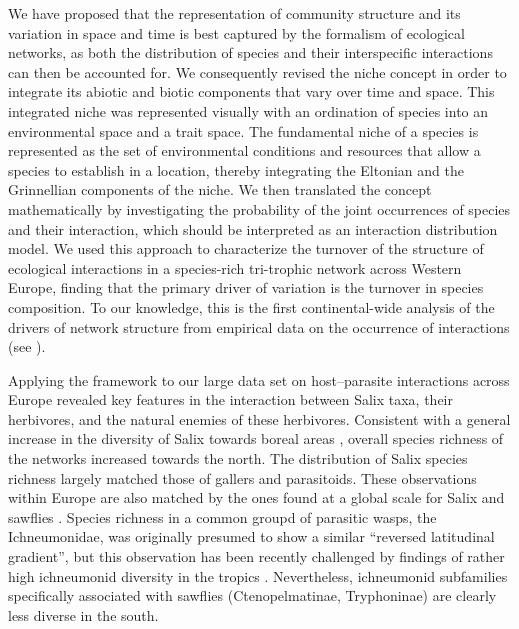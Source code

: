 \documentclass[12pt]{article}
\begin{document}
We have proposed that the representation of community structure and its
variation in space and time is best captured by the formalism of
ecological networks, as both the distribution of species and their
interspecific interactions can then be accounted for. We consequently revised
the niche concept in order to integrate its abiotic and biotic
components that vary over time and space. This
integrated niche was represented visually with an ordination of species into
an environmental space and a trait space. The fundamental niche of a species
is represented as the set of environmental conditions and resources that allow
a species to establish in a location, thereby integrating the Eltonian and the
Grinnellian components of the niche. We then translated the concept
mathematically by investigating the probability of the joint occurrences of
species and their interaction, which should be interpreted as an interaction
distribution model. We used this approach to characterize the turnover of the
structure of ecological interactions in a species-rich tri-trophic network
across Western Europe, finding that the primary driver of variation is the
turnover in species composition. To our knowledge, this is the first
continental-wide analysis of the drivers of network structure from empirical
data on the occurrence of interactions (see \citealt{Baiser2012,Albouy2014,
Poisot2016}).

Applying the framework to our large data set on host–parasite interactions
across Europe revealed key features in the interaction between Salix taxa,
their herbivores, and the natural enemies of these herbivores. Consistent with
a general increase in the diversity of Salix towards boreal areas
\citep{Cronk2015}, overall species richness of the networks increased towards
the north. The distribution of Salix species richness largely matched those of
gallers and parasitoids. These observations within Europe are also matched by
the ones found at a global scale for Salix \citep{Argus1997, Cronk2015,
Wu2015} and sawflies \citep{Kouki1994, Kouki1999}. Species richness in a
common groupd of parasitic wasps, the Ichneumonidae, was originally presumed
to show a similar ``reversed latitudinal gradient'', but this observation has
been recently challenged by findings of rather high ichneumonid diversity in
the tropics \citep{Veijalainen2013}. Nevertheless, ichneumonid subfamilies
specifically associated with sawflies (Ctenopelmatinae, Tryphoninae) are
clearly less diverse in the south.
\end{document}
